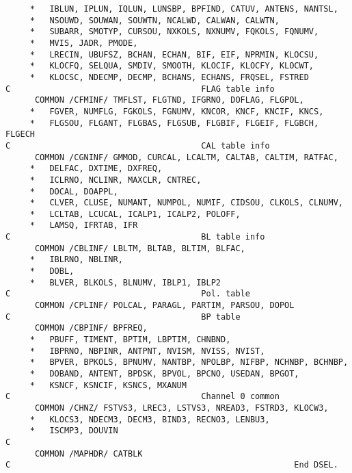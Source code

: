 \begin{verbatim}
     *   IBLUN, IPLUN, IQLUN, LUNSBP, BPFIND, CATUV, ANTENS, NANTSL,
     *   NSOUWD, SOUWAN, SOUWTN, NCALWD, CALWAN, CALWTN,
     *   SUBARR, SMOTYP, CURSOU, NXKOLS, NXNUMV, FQKOLS, FQNUMV,
     *   MVIS, JADR, PMODE,
     *   LRECIN, UBUFSZ, BCHAN, ECHAN, BIF, EIF, NPRMIN, KLOCSU,
     *   KLOCFQ, SELQUA, SMDIV, SMOOTH, KLOCIF, KLOCFY, KLOCWT,
     *   KLOCSC, NDECMP, DECMP, BCHANS, ECHANS, FRQSEL, FSTRED
C                                       FLAG table info
      COMMON /CFMINF/ TMFLST, FLGTND, IFGRNO, DOFLAG, FLGPOL,
     *   FGVER, NUMFLG, FGKOLS, FGNUMV, KNCOR, KNCF, KNCIF, KNCS,
     *   FLGSOU, FLGANT, FLGBAS, FLGSUB, FLGBIF, FLGEIF, FLGBCH, FLGECH
C                                       CAL table info
      COMMON /CGNINF/ GMMOD, CURCAL, LCALTM, CALTAB, CALTIM, RATFAC,
     *   DELFAC, DXTIME, DXFREQ,
     *   ICLRNO, NCLINR, MAXCLR, CNTREC,
     *   DOCAL, DOAPPL,
     *   CLVER, CLUSE, NUMANT, NUMPOL, NUMIF, CIDSOU, CLKOLS, CLNUMV,
     *   LCLTAB, LCUCAL, ICALP1, ICALP2, POLOFF,
     *   LAMSQ, IFRTAB, IFR
C                                       BL table info
      COMMON /CBLINF/ LBLTM, BLTAB, BLTIM, BLFAC,
     *   IBLRNO, NBLINR,
     *   DOBL,
     *   BLVER, BLKOLS, BLNUMV, IBLP1, IBLP2
C                                       Pol. table
      COMMON /CPLINF/ POLCAL, PARAGL, PARTIM, PARSOU, DOPOL
C                                       BP table
      COMMON /CBPINF/ BPFREQ,
     *   PBUFF, TIMENT, BPTIM, LBPTIM, CHNBND,
     *   IBPRNO, NBPINR, ANTPNT, NVISM, NVISS, NVIST,
     *   BPVER, BPKOLS, BPNUMV, NANTBP, NPOLBP, NIFBP, NCHNBP, BCHNBP,
     *   DOBAND, ANTENT, BPDSK, BPVOL, BPCNO, USEDAN, BPGOT,
     *   KSNCF, KSNCIF, KSNCS, MXANUM
C                                       Channel 0 common
      COMMON /CHNZ/ FSTVS3, LREC3, LSTVS3, NREAD3, FSTRD3, KLOCW3,
     *   KLOCS3, NDECM3, DECM3, BIND3, RECNO3, LENBU3,
     *   ISCMP3, DOUVIN
C
      COMMON /MAPHDR/ CATBLK
C                                                          End DSEL.
\end{verbatim}
